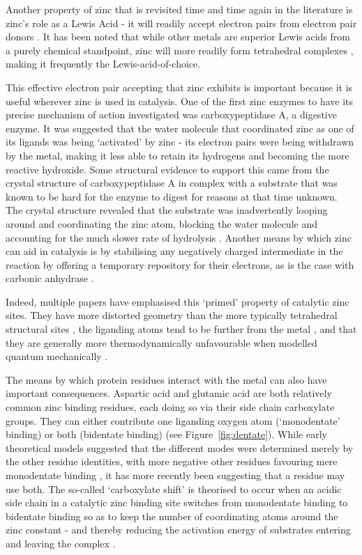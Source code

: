 Another property of zinc that is revisited time and time again in the literature is zinc's role as a Lewis Acid - it will readily accept electron pairs from electron pair donors \cite{williams1984zinc}. It has been noted that while other metals are superior Lewis acids from a purely chemical standpoint, zinc will more readily form tetrahedral complexes \cite{bertini1985zinc}, making it frequently the Lewis-acid-of-choice.

This effective electron pair accepting that zinc exhibits is important because it is useful wherever zinc is used in catalysis. One of the first zinc enzymes to have its precise mechanism of action investigated was carboxypeptidase A, a digestive enzyme. It was suggested that the water molecule that coordinated zinc as one of its ligands was being `activated' by zinc - its electron pairs were being withdrawn by the metal, making it less able to retain its hydrogens and becoming the more reactive hydroxide. Some structural evidence to support this came from the crystal structure of carboxypeptidase A in complex with a substrate that was known to be hard for the enzyme to digest for reasons at that time unknown. The crystal structure revealed that the substrate was inadvertently looping around and coordinating the zinc atom, blocking the water molecule and accounting for the much slower rate of hydrolysis \cite{christianson1986x}. Another means by which zinc can aid in catalysis is by stabilising any negatively charged intermediate in the reaction by offering a temporary repository for their electrons, as is the case with carbonic anhydrase \cite{christianson1996carbonic}.

Indeed, multiple papers have emphasised this `primed' property of catalytic zinc sites. They have more distorted geometry than the more typically tetrahedral structural sites \cite{roe1999zinc}, the liganding atoms tend to be further from the metal \cite{lee2008physical}, and that they are generally more thermodynamically unfavourable when modelled quantum mechanically \cite{sousa2009zinc}.

The means by which protein residues interact with the metal can also have important consequences. Aspartic acid and glutamic acid are both relatively common zinc binding residues, each doing so via their side chain carboxylate groups. They can either contribute one liganding oxygen atom (`monodentate' binding) or both (bidentate binding) (see
Figure~\ref{fig:dentate}). While early theoretical models suggested that the different modes were determined merely by the other residue identities, with more negative other residues favouring mere monodentate binding \cite{ryde1999carboxylate}, it has more recently been suggesting that a residue may use both. The so-called `carboxylate shift' is theorised to occur when an acidic side chain in a catalytic zinc binding site switches from monodentate binding to bidentate binding so as to keep the number of coordinating atoms around the zinc constant - and thereby reducing the activation energy of substrates entering and leaving the complex \cite{sousa2007carboxylate}.


